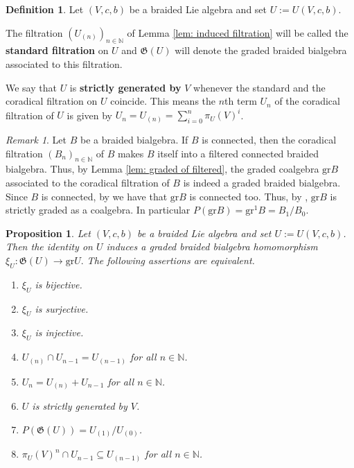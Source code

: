 \documentclass[english]{amsart}
\numberwithin{equation}{section}
\numberwithin{figure}{section}
\theoremstyle{plain}
\theoremstyle{definition}
\newtheorem{defn}[thm]{Definition}
\theoremstyle{definition}
\theoremstyle{remark}
\theoremstyle{remark}
\newtheorem{rem}[thm]{Remark}
\theoremstyle{plain}
\theoremstyle{plain}
\newtheorem{prop}[thm]{Proposition}
\theoremstyle{plain}
\begin{document}
\begin{defn}
Let $\left(V,c,b\right)$ be a braided Lie algebra and set $U:=U(V,c,b)$. 

The filtration $\left(U_{\left(n\right)}\right)_{n\in\mathbb{N}}$
of Lemma \ref{lem: induced filtration} will be called the \textbf{standard
filtration} on $U$ and $\mathfrak{G}\left(U\right)$ will denote
the graded braided bialgebra associated to this filtration.

We say that $U$ is \textbf{strictly generated by} $V$ whenever the
standard and the coradical filtration on $U$ coincide. This means
the $n$th term $U_n$ of the coradical filtration of $U$ is given by $U_{n}=U_{\left(n\right)}=\sum_{i=0}^{n}\pi_{U}\left(V\right)^{i}$. \end{defn}
\begin{rem}
\label{rem:strictisprimgen} Let $B$ be a braided bialgebra. If $B$
is connected, then the coradical filtration $\left(B_{n}\right)_{n\in\mathbb{N}}$
of $B$ makes $B$ itself into a filtered connected braided bialgebra. Thus,
by Lemma \ref{lem: graded of filtered}, the graded coalgebra $\mathrm{gr}B$
associated to the coradical filtration of $B$ is indeed a graded
braided bialgebra. Since $B$ is connected, by \cite[Proposition 11.1.1]{Sw} we have that $\mathrm{gr}B$ is connected too. Thus, by \cite[Lemma 11.2.3]{Sw}, $\mathrm{gr}B$ is strictly graded as a coalgebra. In particular $P(\mathrm{gr}B)=\mathrm{gr}^1B=B_1/B_0$.\end{rem}
\begin{prop}
\label{pro:CoradicalFiltration}Let $\left(V,c,b\right)$ be a braided
Lie algebra and set $U:=U(V,c,b)$. Then the identity on $U$ induces
a graded braided bialgebra homomorphism $\xi_{U}:\mathfrak{G}\left(U\right)\rightarrow\mathrm{gr}U.$
The following assertions are equivalent.
\begin{enumerate}
\item $\xi_{U}$ is bijective.
\item $\xi_{U}$ is surjective.
\item $\xi_{U}$ is injective.
\item $U_{\left(n\right)}\cap U_{n-1}=U_{\left(n-1\right)}$ for
all $n\in\mathbb{N}$.
\item $U_{n}=U_{\left(n\right)}+U_{n-1}$ for all $n\in\mathbb{N}$.
\item $U$ is strictly generated by $V$.
\item $P\left(\mathfrak{G}\left(U\right)\right)=U_{\left(1\right)}/U_{\left(0\right)}$.
\item $\pi_{U}\left(V\right)^{n}\cap U_{n-1}\subseteq U_{\left(n-1\right)}$
for all $n\in\mathbb{N}$.
\end{enumerate}
\end{prop}
\end{document}
